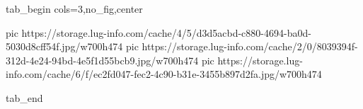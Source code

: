  
 
 
 
 

\ifcmt
  tab_begin cols=3,no_fig,center

     pic https://storage.lug-info.com/cache/4/5/d3d5acbd-c880-4694-ba0d-5030d8cff54f.jpg/w700h474%
		 pic https://storage.lug-info.com/cache/2/0/8039394f-312d-4e24-94bd-4e5f1d55bcb9.jpg/w700h474%
		 pic https://storage.lug-info.com/cache/6/f/ec2fd047-fec2-4c90-b31e-3455b897d2fa.jpg/w700h474%

  tab_end
\fi
